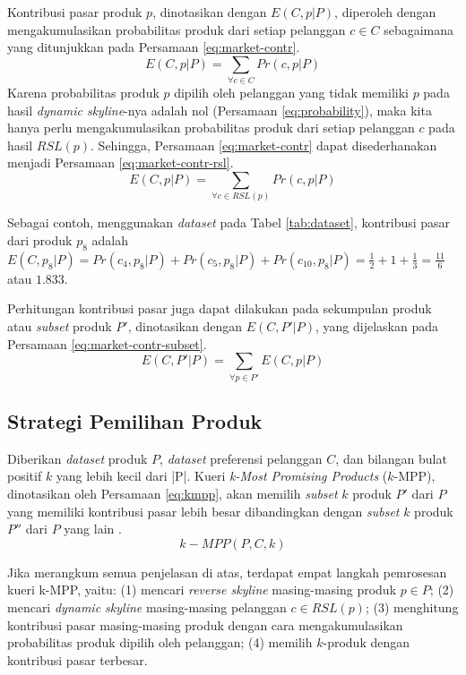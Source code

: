 Kontribusi pasar produk $p$, dinotasikan dengan $E(C, p|P)$, diperoleh dengan mengakumulasikan probabilitas produk dari setiap pelanggan $c \in C$ sebagaimana yang ditunjukkan pada Persamaan \ref{eq:market-contr}.
\begin{equation}\label{eq:market-contr}
E(C, p|P) = \sum_{\forall c \in C} Pr(c, p|P)
\end{equation}
Karena probabilitas produk $p$ dipilih oleh pelanggan yang tidak memiliki $p$ pada hasil \textit{dynamic skyline}-nya adalah nol (Persamaan \ref{eq:probability}), maka kita hanya perlu mengakumulasikan probabilitas produk dari setiap pelanggan $c$ pada hasil $RSL(p)$. Sehingga, Persamaan \ref{eq:market-contr} dapat disederhanakan menjadi Persamaan \ref{eq:market-contr-rsl}.
\begin{equation}\label{eq:market-contr-rsl}
E(C, p|P) = \sum_{\forall c \in RSL(p)} Pr(c, p|P)
\end{equation}

Sebagai contoh, menggunakan \textit{dataset} pada Tabel \ref{tab:dataset}, kontribusi pasar dari produk $p_8$ adalah $E(C, p_8|P) = Pr(c_4, p_8|P) + Pr(c_5, p_8|P) + Pr(c_{10}, p_8|P) = \frac{1}{2} + 1 + \frac{1}{3} = \frac{11}{6}$ atau $1.833$.

Perhitungan kontribusi pasar juga dapat dilakukan pada sekumpulan produk atau \textit{subset} produk $P'$, dinotasikan dengan $E(C, P'|P)$, yang dijelaskan pada Persamaan \ref{eq:market-contr-subset}.
\begin{equation}\label{eq:market-contr-subset}
E(C, P'|P) = \sum_{\forall p \in P'} E(C, p|P)
\end{equation}

\subsection{Strategi Pemilihan Produk}
\tab Diberikan \textit{dataset} produk $P$, \textit{dataset} preferensi pelanggan $C$, dan bilangan bulat positif $k$ yang lebih kecil dari |P|. Kueri \textit{k-Most Promising Products} ($k$-MPP), dinotasikan oleh Persamaan \ref{eq:kmpp}, akan memilih \textit{subset} $k$ produk $P'$ dari $P$ yang memiliki kontribusi pasar lebih besar dibandingkan dengan \textit{subset} $k$ produk $P''$ dari $P$ yang lain \cite{kmpp}.
\begin{equation}\label{eq:kmpp}
k-MPP(P, C, k)
\end{equation}

Jika merangkum semua penjelasan di atas, terdapat empat langkah pemrosesan kueri k-MPP, yaitu: (1) mencari \textit{reverse skyline} masing-masing produk  $p \in P$; (2) mencari \textit{dynamic skyline} masing-masing pelanggan $c \in RSL(p)$; (3) menghitung kontribusi pasar masing-masing produk dengan cara mengakumulasikan probabilitas produk dipilih oleh pelanggan; (4) memilih $k$-produk dengan kontribusi pasar terbesar.

